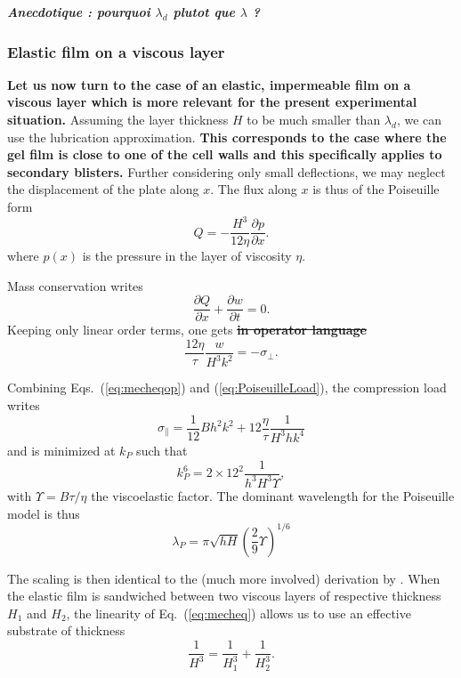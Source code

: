 \documentclass[twocolumn,superscriptaddress,showpacs,preprintnumbers,
amsmath,amssymb,prl]{revtex4-1}
\newcommand{\seb}[1]{\textbf{\color{blue}#1}} %
\newcommand{\sseb}[1]{\sout{\textbf{\color{blue}#1}}} %
\begin{document}
\seb{\it Anecdotique : pourquoi $\lambda_d$ plutot que $\lambda$ ?}

\subsubsection*{Elastic film on a viscous layer}
\seb{Let us now turn to the case of an elastic, impermeable film on a viscous layer which is more relevant for the present experimental situation.} Assuming the layer thickness $H$ to be much smaller than $\lambda_d$, we can use the lubrication approximation. \seb{This corresponds to the case where the gel film is close to one of the cell walls and this specifically applies to secondary blisters.} Further considering only small deflections, we may neglect the displacement of the plate along $x$. The flux along $x$ is thus of the Poiseuille form
\begin{equation}
Q = -\frac{H^3}{12\eta}\frac{\partial p}{\partial x}.
\label{eq:PoiseuilleFlux}
\end{equation}
where $p(x)$ is the pressure in the layer of viscosity $\eta$.

Mass conservation writes
\begin{equation}
\frac{\partial Q}{\partial x} + \frac{\partial w}{\partial t} = 0.
\label{eq:conservation}
\end{equation}
Keeping only linear order terms, one gets \sseb{in operator language}
\begin{equation}
\frac{12\eta}{\tau} \frac{w}{H^3k^2} = -\sigma_\perp.
\label{eq:PoiseuilleLoad}
\end{equation}

Combining Eqs.~(\ref{eq:mecheqop}) and (\ref{eq:PoiseuilleLoad}), the compression load writes
\begin{equation}
\sigma_\parallel = \frac{1}{12}B h^2 k^2 + 12\frac{\eta}{\tau}\frac{1}{H^3 h k^4}
\label{eq:sigma0P}
\end{equation}
and is minimized at $k_P$ such that
\begin{equation}
k_P^6 = 2\times 12^2 \frac{1}{h^3H^3\Upsilon},
\label{eq:kP}
\end{equation}
with $\Upsilon = B\tau/\eta$ the viscoelastic factor. The dominant wavelength for the Poiseuille model is thus
\begin{equation}
\lambda_P = \pi\sqrt{hH}\left(\frac{2}{9}\Upsilon\right)^{1/6}
\end{equation}

The scaling is then identical to the (much more involved) derivation by \citet{Huang2002}. When the elastic film is sandwiched between two viscous layers of respective thickness $H_1$ and $H_2$, the linearity of Eq.~(\ref{eq:mecheq}) allows us to use an effective substrate of thickness 
\begin{equation}
\frac{1}{H^3} = \frac{1}{H_1^3}+\frac{1}{H_2^3}.
\end{equation}
\end{document}
